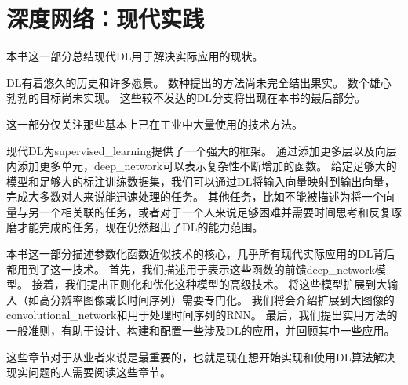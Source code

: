 \part{深度网络：现代实践}
\label{part:deep_networks_modern_practices}

\newpage
本书这一部分总结现代\gls{DL}用于解决实际应用的现状。

\gls{DL}有着悠久的历史和许多愿景。
数种提出的方法尚未完全结出果实。
数个雄心勃勃的目标尚未实现。
这些较不发达的\gls{DL}分支将出现在本书的最后部分。

这一部分仅关注那些基本上已在工业中大量使用的技术方法。

现代\gls{DL}为\gls{supervised_learning}提供了一个强大的框架。
通过添加更多层以及向层内添加更多单元，\gls{deep_network}可以表示复杂性不断增加的函数。
给定足够大的模型和足够大的标注训练数据集，我们可以通过\gls{DL}将输入向量映射到输出向量，完成大多数对人来说能迅速处理的任务。
其他任务，比如不能被描述为将一个向量与另一个相关联的任务，或者对于一个人来说足够困难并需要时间思考和反复琢磨才能完成的任务，现在仍然超出了\gls{DL}的能力范围。

本书这一部分描述参数化函数近似技术的核心，几乎所有现代实际应用的\gls{DL}背后都用到了这一技术。
首先，我们描述用于表示这些函数的前馈\gls{deep_network}模型。
接着，我们提出正则化和优化这种模型的高级技术。
将这些模型扩展到大输入（如高分辨率图像或长时间序列）需要专门化。
我们将会介绍扩展到大图像的\gls{convolutional_network}和用于处理时间序列的\gls{RNN}。
最后，我们提出实用方法的一般准则，有助于设计、构建和配置一些涉及\gls{DL}的应用，并回顾其中一些应用。

这些章节对于从业者来说是最重要的，也就是现在想开始实现和使用\gls{DL}算法解决现实问题的人需要阅读这些章节。




 






